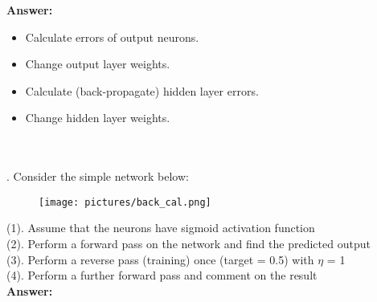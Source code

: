 \documentclass{article}
\begin{document}
\textbf{Answer:} 

\begin{itemize}
    \item Calculate errors of output neurons.
    
    \item Change output layer weights.
    
    \item Calculate (back-propagate) hidden layer errors.
    
    \item Change hidden layer weights.
\end{itemize}
~\\
~\\
. Consider the simple network below: 
\begin{figure}[tbh!]
\centering
\texttt{[image: pictures/back\_cal.png]}
\end{figure}


\noindent (1). Assume that the neurons have sigmoid activation function \\
(2). Perform a forward pass on the network and find the predicted output \\
(3). Perform a reverse pass (training) once (target = 0.5) with $\eta$ = 1 \\
(4). Perform a further forward pass and comment on the result \\
 
\textbf{Answer:} 
\end{document}
